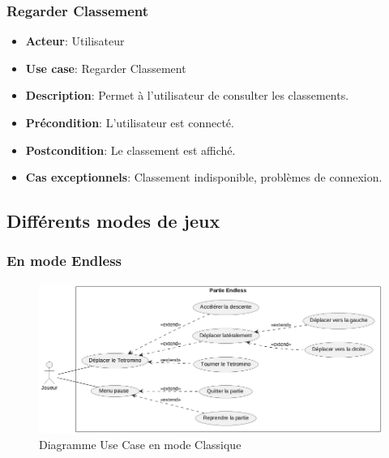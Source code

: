 \documentclass{article}
\begin{document}
\subsubsection*{Regarder Classement}
\begin{itemize}
    \item \textbf{Acteur}: Utilisateur
    \item \textbf{Use case}: Regarder Classement
    \item \textbf{Description}: Permet à l'utilisateur de consulter les classements.
    \item \textbf{Précondition}: L'utilisateur est connecté.
    \item \textbf{Postcondition}: Le classement est affiché.
    \item \textbf{Cas exceptionnels}: Classement indisponible, problèmes de connexion.
\end{itemize}

\newpage

\subsection{Différents modes de jeux}

\subsubsection{En mode Endless}

\begin{figure}[!h]
    \centering
    \includegraphics[width=1\textwidth]{uml/usescase/en-jeu/endless.png}
    \caption{Diagramme Use Case en mode Classique}
    \label{fig:Classique}
\end{figure}
\end{document}

